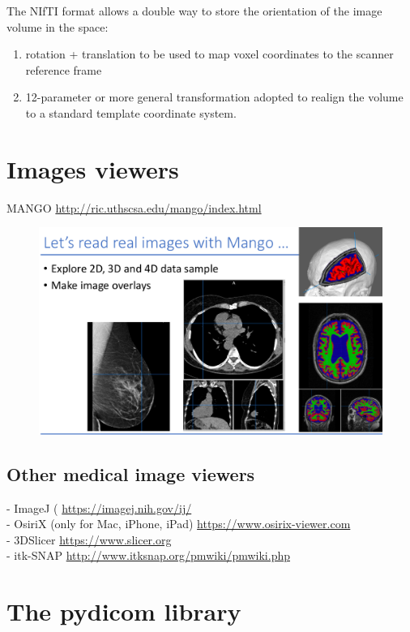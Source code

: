 The NIfTI format allows a double way to store the orientation of the image volume in the
space:

\begin{enumerate}
	\item rotation + translation to be used to map voxel coordinates to the scanner reference frame
	\item 12-parameter or more general transformation adopted to realign the volume to a standard template coordinate system.
\end{enumerate}

\section{Images viewers}

MANGO \url{http://ric.uthscsa.edu/mango/index.html}

\begin{figure}[ht]
	\centering
	\includegraphics[width=0.9\linewidth]{figure_med/mango}
\end{figure}
\FloatBarrier

\subsection{Other medical image viewers}
- ImageJ ( \url{https://imagej.nih.gov/ij/}\\
- OsiriX (only for Mac, iPhone, iPad) \url{https://www.osirix-viewer.com}\\
- 3DSlicer \url{https://www.slicer.org}\\
- itk-SNAP  \url{http://www.itksnap.org/pmwiki/pmwiki.php}

\section{The pydicom library}

